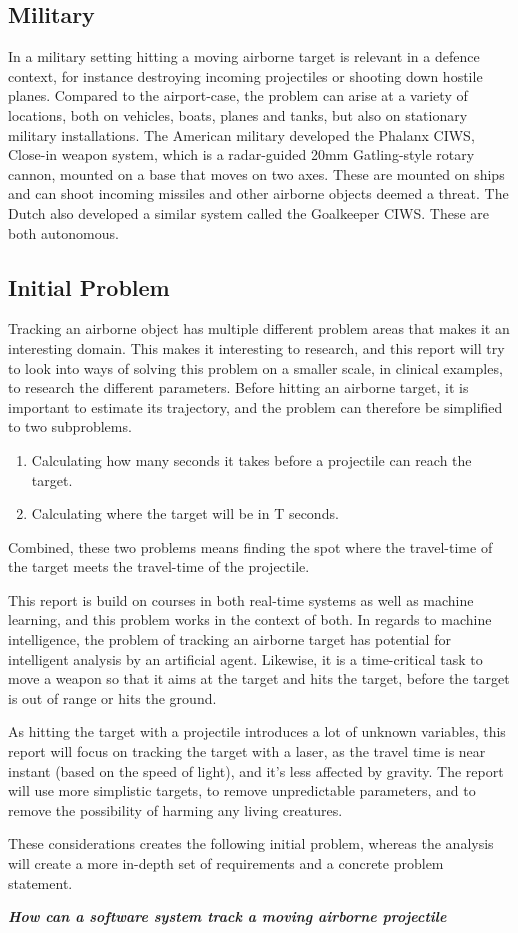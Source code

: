 \subsection{Military}
In a military setting hitting a moving airborne target is relevant in a defence context, for instance destroying incoming projectiles or shooting down hostile planes.
Compared to the airport-case, the problem can arise at a variety of locations, both on vehicles, boats, planes and tanks, but also on stationary military installations.
The American military developed the Phalanx CIWS, Close-in weapon system, which is a radar-guided 20mm Gatling-style rotary cannon, mounted on a base that moves on two axes\cite{PhalanxCIWS}.
These are mounted on ships and can shoot incoming missiles and other airborne objects deemed a threat.
The Dutch also developed a similar system called the Goalkeeper CIWS.
These are both autonomous.

\subsection{Initial Problem}

Tracking an airborne object has multiple different problem areas that makes it an interesting domain.
This makes it interesting to research, and this report will try to look into ways of solving this problem on a smaller scale, in clinical examples, to research the different parameters.
Before hitting an airborne target, it is important to estimate its trajectory, and the problem can therefore be simplified to two subproblems.
\begin{enumerate}
  \item Calculating how many seconds it takes before a projectile can reach the target.
  \item Calculating where the target will be in T seconds.
\end{enumerate}
Combined, these two problems means finding the spot where the travel-time of the target meets the travel-time of the projectile.

This report is build on courses in both real-time systems as well as machine learning, and this problem works in the context of both.
In regards to machine intelligence, the problem of tracking an airborne target has potential for intelligent analysis by an artificial agent.
Likewise, it is a time-critical task to move a weapon so that it aims at the target and hits the target, before the target is out of range or hits the ground.

As hitting the target with a projectile introduces a lot of unknown variables, this report will focus on tracking the target with a laser, as the travel time is near instant (based on the speed of light), and it's less affected by gravity.
The report will use more simplistic targets, to remove unpredictable parameters, and to remove the possibility of harming any living creatures.


These considerations creates the following initial problem, whereas the analysis will create a more in-depth set of requirements and a concrete problem statement.
\begin{center}
  \textit{\textbf{How can a software system track a moving airborne projectile}}
\end{center}
